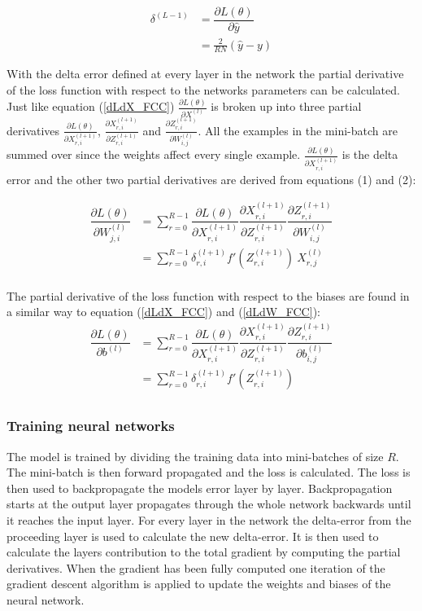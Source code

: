 \documentclass[a4paper,11pt,twoside]{article}
\newcommand*{\pd}[2]{\ensuremath{\dfrac{\partial #1}{\partial #2}}}
\newcommand*{\inpd}[2]{\ensuremath{\frac{\partial #1}{\partial #2}}}
\begin{document}
\begin{equation}\label{MSEdelta}
\begin{split}
\delta^{(L-1)}
	& = \pd{L(\theta)}{\hat{y}}  \\
	& = \frac{2}{RN} (\hat{y}-y)
\end{split}
\end{equation}

With the delta error defined at every layer in the network the partial derivative of the loss function with respect to the networks parameters can be calculated. Just like equation (\ref{dLdX_FCC}) $\inpd{L(\theta)}{X^{(l)}}$ is broken up into three partial derivatives $\inpd{L(\theta)}{X^{(l+1)}_{r,i}}$, $\inpd{X^{(l+1)}_{r,i}}{Z^{(l+1)}_{r,i}}$ and $\inpd{Z^{(l+1)}_{r,i}}{W^{(l)}_{i,j}}$. All the examples in the mini-batch are summed over since the weights affect every single example. $\inpd{L(\theta)}{X^{(l+1)}_{r,i}}$ is the delta error and the other two partial derivatives are derived from equations (1) and (2):

\begin{equation}\label{dLdW_FCC}
\begin{split}
\pd{L(\theta)}{W^{(l)}_{j,i}} 
	& = \sum^{R-1}_{r=0} \pd{L(\theta)}{X^{(l+1)}_{r,i}} \pd{X^{(l+1)}_{r,i}}{Z^{(l+1)}_{r,i}} \pd{Z^{(l+1)}_{r,i}}{W^{(l)}_{i,j}} \\
	& = \sum^{R-1}_{r=0} \delta^{(l+1)}_{r,i} f'(Z^{(l+1)}_{r,i}) \ X^{(l)}_{r,j}\\
\end{split}
\end{equation}

The partial derivative of the loss function with respect to the biases are found in a similar way to equation (\ref{dLdX_FCC}) and (\ref{dLdW_FCC}):
\begin{equation}\label{dLdb_FCC}
\begin{split}
\pd{L(\theta)}{b^{(l)}} 
	& = \sum^{R-1}_{r=0} \pd{L(\theta)}{X^{(l+1)}_{r,i}} \pd{X^{(l+1)}_{r,i}}{Z^{(l+1)}_{r,i}} \pd{Z^{(l+1)}_{r,i}}{b^{(l)}_{i,j}} \\
	& = \sum^{R-1}_{r=0} \delta^{(l+1)}_{r,i} f'(Z^{(l+1)}_{r,i}) \\
\end{split}
\end{equation}


\subsubsection{Training neural networks}
The model is trained by dividing the training data into mini-batches of size $R$. The mini-batch is then forward propagated and the loss is calculated. The loss is then used to backpropagate the models error layer by layer. Backpropagation starts at the output layer propagates through the whole network backwards until it reaches the input layer. For every layer in the network the delta-error from the proceeding layer is used to calculate the new delta-error. It is then used to calculate the layers contribution to the total gradient by computing the partial derivatives. When the gradient has been fully computed one iteration of the gradient descent algorithm is applied to update the weights and biases of the neural network. \cite{cs231n}
\end{document}
